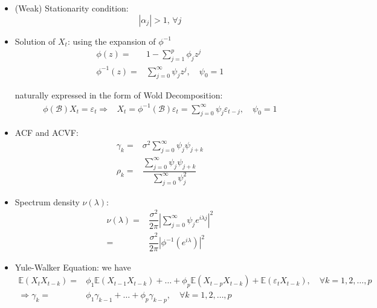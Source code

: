     \begin{itemize}[topsep=2pt,itemsep=0pt]
        \item (Weak) Stationarity condition: 
        \begin{equation}
            |\alpha _j| > 1,\,\forall j
        \end{equation}
        
        \item Solution of $ X_t $: using the expansion of $ \phi ^{-1} $
        \begin{align}
            \phi (z)=&1-\sum_{j=1}^p\phi _jz^j\\
            \phi ^{-1}(z)=&\sum_{j=0}^\infty \psi _{j}z^j,\quad \psi _0=1
        \end{align}

        naturally expressed in the form of Wold Decomposition:
        \begin{align}
            \phi (\mathscr{B} )X_t=\varepsilon _t\Rightarrow & X_t=\phi ^{-1}(\mathscr{B} )\varepsilon _t=\sum_{j=0}^\infty \psi _j\varepsilon _{t-j},\quad \psi _0=1
        \end{align}

        \item ACF and ACVF:
        \begin{align}
            \gamma _k=&\sigma ^2\sum_{j=0}^\infty \psi _j\psi _{j+k}\\
            \rho _k=&\dfrac{\sum_{j=0}^\infty\psi _j\psi _{j+k}}{\sum_{j=0}^\infty\psi _j^2}
        \end{align}
        \item Spectrum density $ \nu (\lambda ) $:
        \begin{align}
            \nu  (\lambda )=&\dfrac{\sigma ^2}{2\pi}\left\vert \sum_{j=0}^\infty \psi _je^{i\lambda j} \right\vert^2\\
            =& \dfrac{\sigma ^2}{2\pi}\left\vert\phi ^{-1}(e^{i\lambda })\right\vert^2
        \end{align}
        \item Yule-Walker Equation: we have
        \begin{align}
            \mathbb{E}\left( X_tX_{t-k} \right) =&\phi _1\mathbb{E}\left( X_{t-1}X_{t-k} \right) +\ldots+\phi _p\mathbb{E}\left( X_{t-p}X_{t-k} \right) +\mathbb{E}\left( \varepsilon _tX_{t-k} \right)  ,\quad \forall k=1,2,\ldots,p\\
            \Rightarrow \gamma _k=&\phi _1\gamma_{k-1}+\ldots+\phi _p\gamma _{k-p}, \quad \forall k=1,2,\ldots,p
        \end{align}


\end{itemize}
